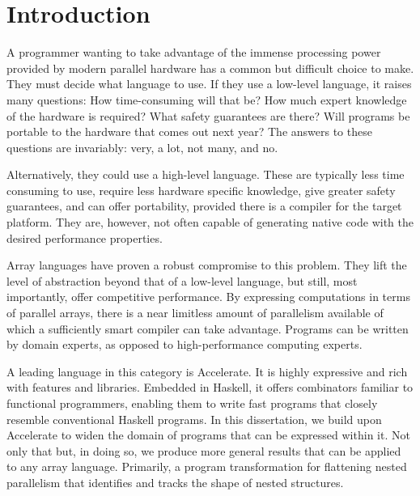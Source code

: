 \chapter{Introduction}



A programmer wanting to take advantage of the immense processing power provided by modern parallel hardware has a common but difficult choice to make. They must decide what language to use. If they use a low-level language, it raises many questions: How time-consuming will that be? How much expert knowledge of the hardware is required?  What safety guarantees are there? Will programs be portable to the hardware that comes out next year? The answers to these questions are invariably: very, a lot, not many, and no.

Alternatively, they could use a high-level language. These are typically less time consuming to use, require less hardware specific knowledge, give greater safety guarantees, and can offer portability, provided there is a compiler for the target platform. They are, however, not often capable of generating native code with the desired performance properties.

Array languages have proven a robust compromise to this problem. They lift the level of abstraction beyond that of a low-level language, but still, most importantly, offer competitive performance. By expressing computations in terms of parallel arrays, there is a near limitless amount of parallelism available of which a sufficiently smart compiler can take advantage. Programs can be written by domain experts, as opposed to high-performance computing experts.

A leading language in this category is Accelerate. It is highly expressive and rich with features and libraries. Embedded in Haskell, it offers combinators familiar to functional programmers, enabling them to write fast programs that closely resemble conventional Haskell programs. In this dissertation, we build upon Accelerate to widen the domain of programs that can be expressed within it. Not only that but, in doing so, we produce more general results that can be applied to any array language. Primarily, a program transformation for flattening nested parallelism that identifies and tracks the shape of nested structures.

